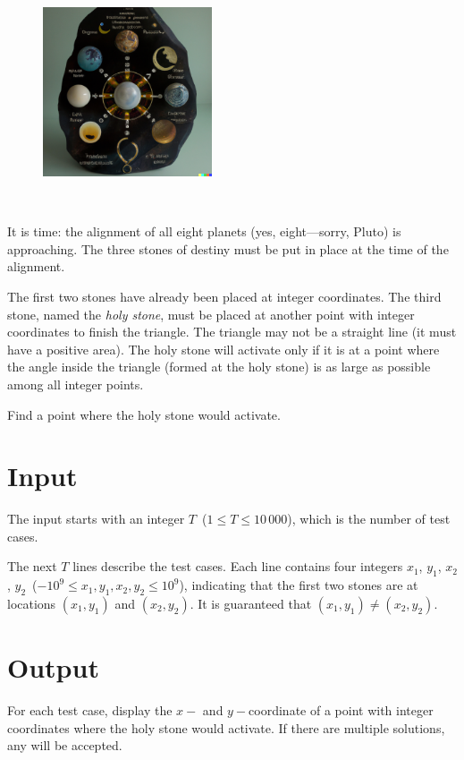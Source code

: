 
\begin{figure}
 \includegraphics[width=50mm]{img.png}
\end{figure}
~

It is time: the alignment of all eight planets (yes, eight---sorry, Pluto) is approaching. 
 The three stones of destiny must be put in place at the time of the alignment.

The first two stones have already been placed at integer coordinates. The third stone, named the \textit{holy stone}, must be placed at another point with integer coordinates to finish the triangle. The triangle may not be a straight line (it must have a positive area). The holy stone will activate only if it is at a point where the angle inside the triangle (formed at the holy stone) is as large as possible among all integer points.

Find a point where the holy stone would activate.


\section*{Input}

The input starts with an integer $T$~($1 \leq T \leq 10\,000$), which is the number of test cases.

The next $T$ lines describe the test cases. Each line contains four integers $x_1$, $y_1$, $x_2$, $y_2$~($-10^9 \leq x_1, y_1, x_2, y_2 \leq 10^9$), indicating that the first two stones are at locations $(x_1, y_1)$ and $(x_2, y_2)$. It is guaranteed that $(x_1, y_1) \neq (x_2, y_2)$.


\section*{Output}

For each test case, display the $x-$ and $y-$coordinate of a point with integer coordinates where the holy stone would activate. If there are multiple solutions, any will be accepted.

